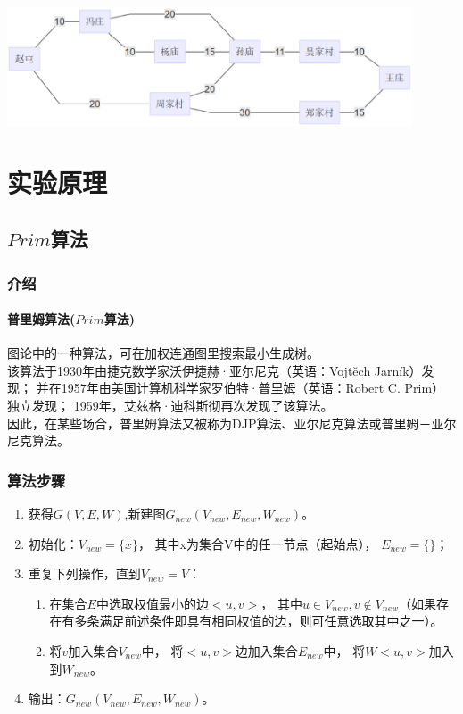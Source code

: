 \documentclass[a4paper,10pt]{ctexart}
\begin{document}
\includegraphics[width=0.9\textwidth]{../Pics/MiniTree.eps}

\section{实验原理}
\subsection{$Prim$算法}
\subsubsection{介绍}
\paragraph{普里姆算法($Prim$算法)}
图论中的一种算法，可在加权连通图里搜索最小生成树。\\
该算法于1930年由捷克数学家沃伊捷赫·亚尔尼克（英语：Vojtěch Jarník）发现；
并在1957年由美国计算机科学家罗伯特·普里姆（英语：Robert C. Prim）独立发现；
1959年，艾兹格·迪科斯彻再次发现了该算法。\\
因此，在某些场合，普里姆算法又被称为DJP算法、亚尔尼克算法或普里姆－亚尔尼克算法。

\subsubsection{算法步骤}
\begin{enumerate}
  \item 获得$G(V,E,W)$,新建图$G_{new}(V_{new},E_{new},W_{new})$。
  \item 初始化：$V_{new} = \{x\}$，
        其中x为集合V中的任一节点（起始点），
        $E_{new} = \{ \} $；
  \item 重复下列操作，直到$V_{new} = V$：
    \begin{enumerate}
        \item 在集合$E$中选取权值最小的边$<u, v>$，
        其中$u\in V_{new},v \not\in V_ {new}$（如果存在有多条满足前述条件即具有相同权值的边，则可任意选取其中之一）。
        \item   将$v$加入集合$V_{new}$中，
                将$<u,v>$边加入集合$E_{new}$中，
                将$W<u,v>$加入到$W_{new}$。
  \end{enumerate}
  \item 输出：$G_{new}(V_{new},E_{new},W_{new})$。
\end{enumerate}
\end{document}
